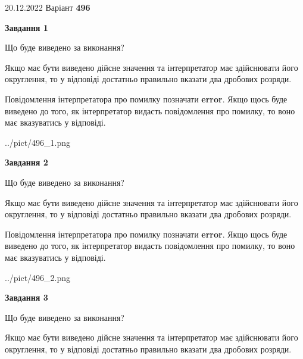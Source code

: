 \documentclass[12pt, ukrainian]{article}
\begin{document}
{20.12.2022 Варіант \No \textbf { 496 }\par}
{
\begin {Large}

{\begin {center}\textbf{Завдання 1}\end {center}}\par
Що буде виведено за виконання? \par

Якщо має бути виведено дійсне значення та інтерпретатор має здійснювати його округлення, 
то у відповіді достатньо правильно вказати два дробових розряди.

Повідомлення інтерпретатора про помилку позначати \textbf{error}.
Якщо щось буде виведено до того, як інтерпретатор видасть повідомлення про помилку, 
то воно має вказуватись у відповіді. \par

\begin{center}
	{../pict/496_1.png}
\end{center}
\newpage

{\begin {center}\textbf{Завдання 2}\end {center}}\par
Що буде виведено за виконання? \par

Якщо має бути виведено дійсне значення та інтерпретатор має здійснювати його округлення, 
то у відповіді достатньо правильно вказати два дробових розряди.

Повідомлення інтерпретатора про помилку позначати \textbf{error}.
Якщо щось буде виведено до того, як інтерпретатор видасть повідомлення про помилку, 
то воно має вказуватись у відповіді. \par

\begin{center}
	{../pict/496_2.png}
\end{center}
\newpage

{\begin {center}\textbf{Завдання 3}\end {center}}\par
Що буде виведено за виконання? \par

Якщо має бути виведено дійсне значення та інтерпретатор має здійснювати його округлення, 
то у відповіді достатньо правильно вказати два дробових розряди.


\end{Large}}
\end{document}
